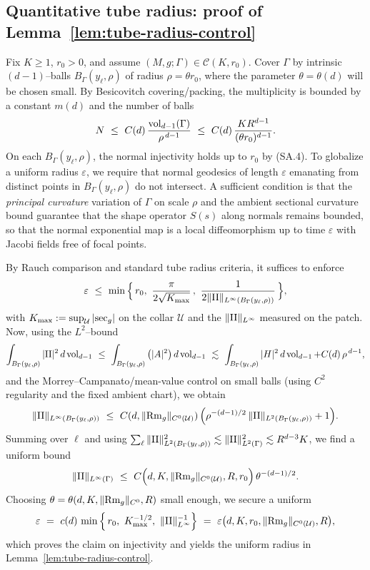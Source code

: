 \subsection{Quantitative tube radius: proof of Lemma~\ref{lem:tube-radius-control}}
\label{subsec:tube-radius}

Fix $K\ge 1$, $r_0>0$, and assume $(M,g;\Gamma)\in\mathcal{C}(K,r_0)$.
Cover $\Gamma$ by intrinsic $(d\!-\!1)$–balls $B_\Gamma(y_\ell,\rho)$ of radius $\rho=\theta r_0$,
where the parameter $\theta=\theta(d)$ will be chosen small.
By Besicovitch covering/packing, the multiplicity is bounded by a constant $m(d)$ and the number of balls
\[
N\ \le\ C(d)\,\frac{\vol_{d-1}(\Gamma)}{\rho^{\,d-1}}\ \le\ C(d)\,\frac{K R^{d-1}}{(\theta r_0)^{d-1}}.
\]
On each $B_\Gamma(y_\ell,\rho)$, the normal injectivity holds up to $r_0$ by (SA.4).
To globalize a uniform radius $\varepsilon$, we require that normal geodesics of length $\varepsilon$
emanating from distinct points in $B_\Gamma(y_\ell,\rho)$ do not intersect.
A sufficient condition is that the \emph{principal curvature} variation of $\Gamma$ on scale $\rho$
and the ambient sectional curvature bound guarantee that the shape operator $S(s)$ along normals remains
bounded, so that the normal exponential map is a local diffeomorphism up to time $\varepsilon$
with Jacobi fields free of focal points.

By Rauch comparison and standard tube radius criteria, it suffices to enforce
\[
\varepsilon\ \le\ \min\Big\{\,r_0,\ \frac{\pi}{2\sqrt{K_{\max}}}\,,\ \frac{1}{2\|\II\|_{L^\infty(B_\Gamma(y_\ell,\rho))}}\,\Big\},
\]
with $K_{\max}:=\sup_{\mathcal{U}} |{\rm sec}_g|$ on the collar $\mathcal{U}$ and the $\|\mathrm{II}\|_{L^\infty}$ measured on the patch.
Now, using the $L^2$–bound
\[
\int_{B_\Gamma(y_\ell,\rho)} |\mathrm{II}|^2\,d\operatorname{vol}_{d-1}\ \le\ \int_{B_\Gamma(y_\ell,\rho)} \big(|A|^2\big)\,d\operatorname{vol}_{d-1}
\ \lesssim\ \int_{B_\Gamma(y_\ell,\rho)} |H|^2\,d\operatorname{vol}_{d-1} + C(d)\,\rho^{\,d-1},
\]
and the Morrey–Campanato/mean-value control on small balls (using $C^2$ regularity and the fixed ambient chart),
we obtain
\[
\|\II\|_{L^\infty(B_\Gamma(y_\ell,\rho))}\ \le\ C(d,\|{\rm Rm}_g\|_{C^0(\mathcal{U})})\,
\Big(\rho^{-(d-1)/2}\,\|\II\|_{L^2(B_\Gamma(y_\ell,\rho))} + 1\Big).
\]
Summing over $\ell$ and using $\sum_\ell \|\mathrm{II}\|_{L^2(B_\Gamma(y_\ell,\rho))}^2 \lesssim \|\mathrm{II}\|_{L^2(\Gamma)}^2 \lesssim R^{d-3}K$,
we find a uniform bound
\[
\|\mathrm{II}\|_{L^\infty(\Gamma)}\ \le\ C\Big(d, K,\|{\rm Rm}_g\|_{C^0(\mathcal{U})}, R, r_0\Big)\,\theta^{-(d-1)/2}.
\]
Choosing $\theta=\theta(d,K,\|{\rm Rm}_g\|_{C^0},R)$ small enough, we secure a uniform
\[
\varepsilon\ =\ c(d)\,\min\Big\{\, r_0,\ K_{\max}^{-1/2},\  \|\II\|_{L^\infty}^{-1}\Big\}
\ =\ \varepsilon\big(d,K,r_0,\|{\rm Rm}_g\|_{C^0(\mathcal{U})},R\big),
\]
which proves the claim on injectivity and yields the uniform radius in Lemma~\ref{lem:tube-radius-control}.

